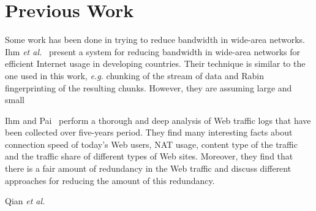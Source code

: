 \section{Previous Work}\label{sec:rel_work}
Some work has been done in trying to reduce bandwidth in wide-area networks. Ihm \textit{et al.}~\cite{wanax} present 
a system for reducing bandwidth in wide-area networks for efficient Internet usage in developing countries. Their 
technique is similar to the one used in this work, \textit{e.g.} chunking of the stream of data and Rabin fingerprinting 
of the resulting chunks. However, they are assuming large and small  

Ihm and Pai~\cite{modern_web_traffic} perform a thorough and deep analysis of Web traffic logs that have been collected 
over five-years period. They find many interesting facts about connection speed of today's Web users, NAT usage, content type
of the traffic and the traffic share of different types of Web sites. Moreover, they find that there is a fair amount 
of redundancy in the Web traffic and discuss different approaches for reducing the amount of this redundancy.

Qian \textit{et al.}~\cite{web_caching}

